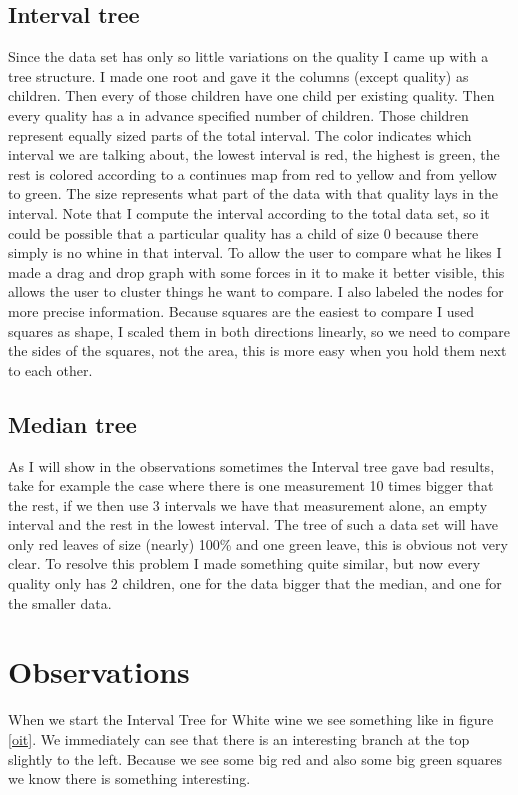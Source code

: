 \documentclass[a4paper,twoside,11pt]{article}
\begin{document}
\subsection{Interval tree}
Since the data set has only so little variations on the quality I came up with a tree structure. I made one root and gave it the columns (except quality) as children. Then every of those children have one child per existing quality. Then every quality has a in advance specified number of children. Those children represent equally sized parts of the total interval. The color indicates which interval we are talking about, the lowest interval is red, the highest is green, the rest is colored according to a continues map from red to yellow and from yellow to green. The size represents what part of the data with that quality lays in the interval. Note that I compute the interval according to the total data set, so it could be possible that a particular quality has a child of size 0 because there simply is no whine in that interval. To allow the user to compare what he likes I made a drag and drop graph with some forces in it to make it better visible, this allows the user to cluster things he want to compare. I also labeled the nodes for more precise information. Because squares are the easiest to compare I used squares as shape, I scaled them in both directions linearly, so we need to compare the sides of the squares, not the area, this is more easy when you hold them next to each other.

\subsection{Median tree}
As I will show in the observations sometimes the Interval tree gave bad results, take for example the case where there is one measurement 10 times bigger that the rest, if we then use 3 intervals we have that measurement alone, an empty interval and the rest in the lowest interval. The tree of such a data set will have only red leaves of size (nearly) 100\% and one green leave, this is obvious not very clear. To resolve this problem I made something quite similar, but now every quality only has 2 children, one for the data bigger that the median, and one for the smaller data.

\section{Observations}
When we start the Interval Tree for White wine we see something like in figure \ref{oit}. We immediately can see that there is an interesting branch at the top slightly to the left. Because we see some big red and also some big green squares we know there is something interesting.
\end{document}
